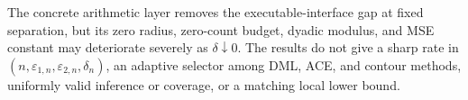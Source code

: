 The concrete arithmetic layer removes the executable-interface gap at fixed separation, but its zero radius, zero-count budget, dyadic modulus, and MSE constant may deteriorate severely as \(\delta\downarrow0\).  The results do not give a sharp rate in \((n,\varepsilon_{1,n},\varepsilon_{2,n},\delta_n)\), an adaptive selector among DML, ACE, and contour methods, uniformly valid inference or coverage, or a matching local lower bound.